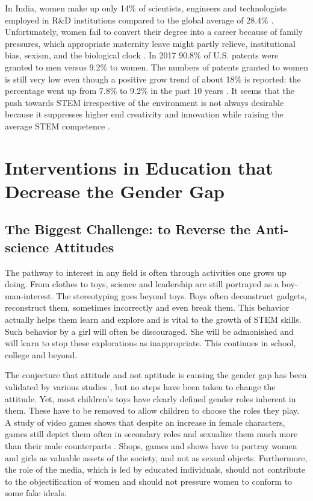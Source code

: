 \documentclass[utf8]{frontiersSCNS} %
\begin{document}
In India, women make up only 14\% of scientists, engineers and technologists employed in R\&D institutions compared to the global average of 28.4\% \citep{TimesOfIndia}. Unfortunately, women fail to convert their degree into a career because of family pressures, which appropriate maternity leave might partly relieve, institutional bias, sexism, and the biological clock \citep{bal2004women,TimesOfIndia}. In 2017 90.8\% of U.S. patents were granted to men versus 9.2\% to women. The numbers of patents granted to women is still very low even though a positive grow trend of about 18\% is reported: the percentage went up from 7.8\% to 9.2\% in the past 10 years \citep{womenPatents}. It seems that the push towards STEM irrespective of the environment is not always desirable because it suppresses higher end creativity and innovation while raising the average STEM competence \citep{nager2016demographics}. 


\section{Interventions in Education that Decrease the Gender Gap}
\label{Intervention}
\subsection{The Biggest Challenge: to Reverse the Anti-science Attitudes}
\label{in1}
The pathway to interest in any field is often through activities one grows up doing. From clothes to toys, science and leadership are still portrayed as a boy-man-interest. The stereotyping goes beyond toys. Boys often deconstruct gadgets, reconstruct them, sometimes incorrectly and even break them. This behavior actually helps them learn and explore and is vital to the growth of STEM skills. Such behavior by a girl will often be discouraged. She will be admonished and will learn to stop these explorations as inappropriate. This continues in school, college and beyond. %

The conjecture that attitude and not aptitude is causing the gender gap has been validated by various studies  \citep{penner2015gender, leslie2015expectations, organisation2015abc}, but no steps have been taken to change the attitude. Yet, most children’s toys have clearly defined gender roles inherent in them. These have to be removed to allow children to choose the roles they play.  A study of video games shows that despite an increase in female characters, games still depict them often in secondary roles and sexualize them much more than their male counterparts \citep{lynch2016sexy}. Shops, games and shows have to portray women and girls as valuable assets of the society, and not as sexual objects. Furthermore, the role of the media, which is led by educated individuals, should not contribute to the objectification of women and should not  pressure women to conform to some fake ideals.
 
\end{document}
